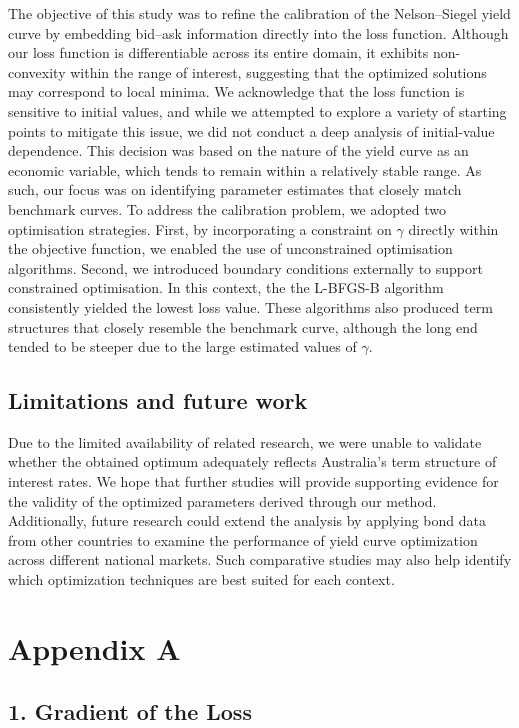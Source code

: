 \documentclass[12pt]{article}
\begin{document}
The objective of this study was to refine the calibration of the Nelson–Siegel yield curve by embedding bid–ask information directly into the loss function. Although our loss function is differentiable across its entire domain, it exhibits non-convexity within the range of interest, suggesting that the optimized solutions may correspond to local minima. We acknowledge that the loss function is sensitive to initial values, and while we attempted to explore a variety of starting points to mitigate this issue, we did not conduct a deep analysis of initial-value dependence. This decision was based on the nature of the yield curve as an economic variable, which tends to remain within a relatively stable range. As such, our focus was on identifying parameter estimates that closely match benchmark curves. To address the calibration problem, we adopted two optimisation strategies. First, by incorporating a constraint on $\gamma$ directly within the objective function, we enabled the use of unconstrained optimisation algorithms. Second, we introduced boundary conditions externally to support constrained optimisation. In this context, the the L-BFGS-B algorithm consistently yielded the lowest loss value. These algorithms also produced term structures that closely resemble the benchmark curve, although the long end tended to be steeper due to the large estimated values of $\gamma$.

\subsection{Limitations and future work} 

Due to the limited availability of related research, we were unable to validate whether the obtained optimum adequately reflects Australia's term structure of interest rates. We hope that further studies will provide supporting evidence for the validity of the optimized parameters derived through our method. Additionally, future research could extend the analysis by applying bond data from other countries to examine the performance of yield curve optimization across different national markets. Such comparative studies may also help identify which optimization techniques are best suited for each context.


\clearpage
\section*{Appendix A}

\subsection*{1. Gradient of the Loss}
\end{document}

